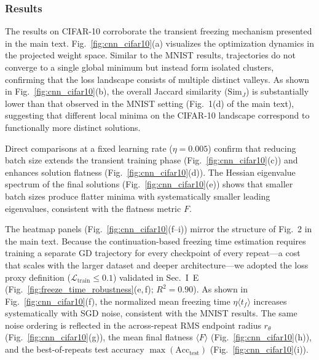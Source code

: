 \documentclass[aps,prx,preprint,superscriptaddress,nofootinbib]{revtex4-2}
\begin{document}
\subsubsection{Results}
The results on CIFAR-10 corroborate the transient freezing mechanism presented in the main text. Fig.~\ref{fig:cnn_cifar10}(a) visualizes the optimization dynamics in the projected weight space. Similar to the MNIST results, trajectories do not converge to a single global minimum but instead form isolated clusters, confirming that the loss landscape consists of multiple distinct valleys. As shown in Fig.~\ref{fig:cnn_cifar10}(b), the overall Jaccard similarity ($\mathrm{Sim}_J$) is substantially lower than that observed in the MNIST setting (Fig.~1(d) of the main text), suggesting that different local minima on the CIFAR-10 landscape correspond to functionally more distinct solutions.

Direct comparisons at a fixed learning rate ($\eta=0.005$) confirm that reducing batch size extends the transient training phase (Fig.~\ref{fig:cnn_cifar10}(c)) and enhances solution flatness (Fig.~\ref{fig:cnn_cifar10}(d)). The Hessian eigenvalue spectrum of the final solutions (Fig.~\ref{fig:cnn_cifar10}(e)) shows that smaller batch sizes produce flatter minima with systematically smaller leading eigenvalues, consistent with the flatness metric $F$.

The heatmap panels (Fig.~\ref{fig:cnn_cifar10}(f--i)) mirror the structure of Fig.~2 in the main text. Because the continuation-based freezing time estimation requires training a separate GD trajectory for every checkpoint of every repeat---a cost that scales with the larger dataset and deeper architecture---we adopted the loss proxy definition ($\mathcal{L}_\mathrm{train} \leq 0.1$) validated in Sec.~I~E (Fig.~\ref{fig:freeze_time_robustness}(e,\,f); $R^2 = 0.90$). As shown in Fig.~\ref{fig:cnn_cifar10}(f), the normalized mean freezing time $\eta\langle t_f \rangle$ increases systematically with SGD noise, consistent with the MNIST results. The same noise ordering is reflected in the across-repeat RMS endpoint radius $r_\theta$ (Fig.~\ref{fig:cnn_cifar10}(g)), the mean final flatness $\langle F \rangle$ (Fig.~\ref{fig:cnn_cifar10}(h)), and the best-of-repeats test accuracy $\max(\mathrm{Acc}_\mathrm{test})$ (Fig.~\ref{fig:cnn_cifar10}(i)).
\end{document}
